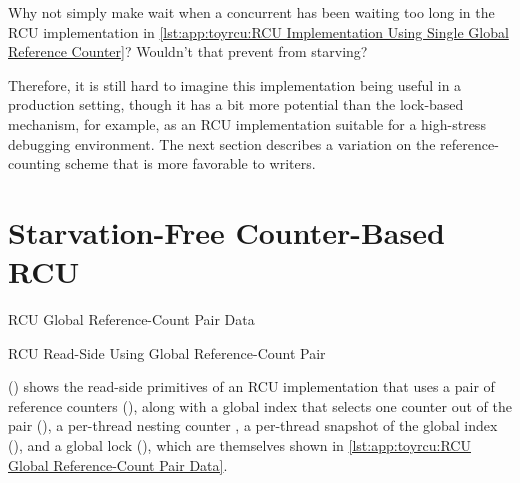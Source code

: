 \QuickQuiz{}
	Why not simply make  wait when a concurrent
	 has been waiting too long in
	the RCU implementation in
	\cref{lst:app:toyrcu:RCU Implementation Using Single Global Reference Counter}?
	Wouldn't that prevent  from starving?
 \QuickQuizEnd

Therefore, it is still hard to imagine this implementation being useful
in a production setting, though it has a bit more potential
than the lock-based mechanism, for example, as an RCU implementation
suitable for a high-stress debugging environment.
The next section describes a variation on the reference-counting
scheme that is more favorable to writers.

\section{Starvation-Free Counter-Based RCU}
\label{sec:app:toyrcu:Starvation-Free Counter-Based RCU}

\begin{listing}[tbp]

\caption{RCU Global Reference-Count Pair Data}
\label{lst:app:toyrcu:RCU Global Reference-Count Pair Data}
\end{listing}

\begin{listing}[tbp]

\caption{RCU Read-Side Using Global Reference-Count Pair}
\label{lst:app:toyrcu:RCU Read-Side Using Global Reference-Count Pair}
\end{listing}

()
shows the read-side primitives of an RCU implementation that uses a pair
of reference counters (),
along with a global index that
selects one counter out of the pair (),
a per-thread nesting counter ,
a per-thread snapshot of the global index (),
and a global lock (),
which are themselves shown in
\cref{lst:app:toyrcu:RCU Global Reference-Count Pair Data}.

